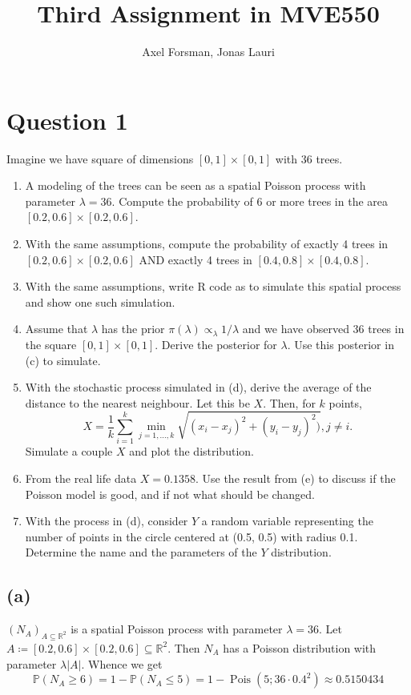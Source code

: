 \documentclass{article}
\title{Third Assignment in MVE550}
\author{Axel Forsman, Jonas Lauri}
\DeclareMathOperator\Poisson{Pois}
\begin{document}

\section{Question 1}
Imagine we have square of dimensions $[0,1] \times [0,1]$ with 36 trees.
\begin{enumerate}[label=(\alph*)]
	\item A modeling of the trees can be seen as a spatial Poisson process with parameter $\lambda = 36$. Compute the probability of 6 or more trees in the area $[0.2, 0.6] \times [0.2, 0.6]$.
	\item With the same assumptions, compute the probability of exactly 4 trees in $[0.2, 0.6] \times [0.2, 0.6]$ AND exactly 4 trees in $[0.4, 0.8] \times [0.4, 0.8]$. 
	\item With the same assumptions, write R code as to simulate this spatial process and show one such simulation.
	\item Assume that $\lambda$ has the prior $\pi(\lambda) \propto_\lambda 1/\lambda$ and we have observed 36 trees in the square $[0,1] \times [0,1]$. Derive the posterior for $\lambda$. Use this posterior in (c) to simulate.
	\item With the stochastic process simulated in (d), derive the average of the distance to the nearest neighbour. Let this be $X$. Then, for $k$ points, 
	$$X = \frac{1}{k}\sum_{i=1}^k \min_{j = 1, ..., k} \sqrt{(x_i-x_j)^2+(y_i-y_j)^2)}, j \neq i.$$
	Simulate a couple $X$ and plot the distribution.
	\item From the real life data $X = 0.1358$. Use the result from (e) to discuss if the Poisson model is good, and if not what should be changed. 
	\item With the process in (d), consider $Y$ a random variable representing the number of points in the circle centered at (0.5, 0.5) with radius 0.1. Determine the name and the parameters of the $Y$ distribution.
\end{enumerate}

\subsection{(a)}
$(N_A)_{A \subseteq \mathbb R^2}$ is a spatial Poisson process
with parameter $\lambda = 36$.
Let $A \coloneqq [0.2, 0.6] \times [0.2, 0.6] \subseteq \mathbb R^2$.
Then $N_A$ has a Poisson distribution with parameter $\lambda \lvert A \rvert$.
Whence we get
$$ \mathbb P(N_A \ge 6) = 1 - \mathbb P(N_A \le 5) = 1 - \Poisson(5; 36 \cdot 0.4^2)
\approx \num{0.5150434} $$
\end{document}
